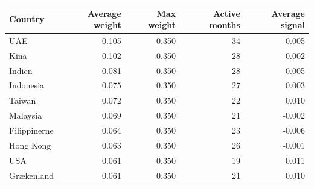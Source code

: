 \begin{tabular}{lrrrr}
\toprule
Country & Average weight & Max weight & Active months & Average signal \\
\midrule
UAE & 0.105 & 0.350 & 34 & 0.005 \\
Kina & 0.102 & 0.350 & 28 & 0.002 \\
Indien & 0.081 & 0.350 & 28 & 0.005 \\
Indonesia & 0.075 & 0.350 & 27 & 0.003 \\
Taiwan & 0.072 & 0.350 & 22 & 0.010 \\
Malaysia & 0.069 & 0.350 & 21 & -0.002 \\
Filippinerne & 0.064 & 0.350 & 23 & -0.006 \\
Hong Kong & 0.063 & 0.350 & 26 & -0.001 \\
USA & 0.061 & 0.350 & 19 & 0.011 \\
Grækenland & 0.061 & 0.350 & 21 & 0.010 \\
\bottomrule
\end{tabular}
